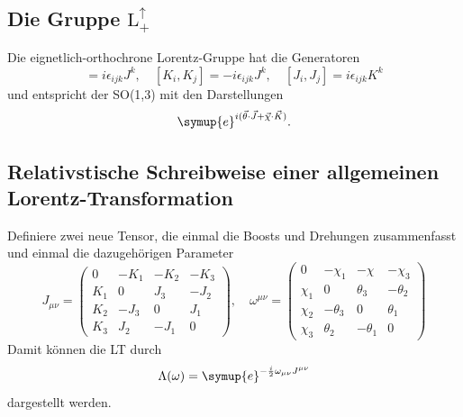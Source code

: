 \documentclass[
  captions=tableheading,  %
  titlepage=firstiscover, %
]{scrartcl}
\begin{document}
\subsection{Die Gruppe \texorpdfstring{$\text{L}_+^{\uparrow}$}{PDFstring} }
Die eignetlich-orthochrone Lorentz-Gruppe hat die Generatoren 
\begin{equation*}
  [J_i,J_j] = i \epsilon_{ijk} J^k,\quad [K_i, K_j] = - i \epsilon_{ijk} J^k, 
  \quad [J_i,J_j] = i \epsilon_{ijk} K^k \label{eqn:genspinor}
\end{equation*}
und entspricht der SO(1,3) mit den Darstellungen
\begin{equation*}
  \symup{e}^{i(\vec{\theta} \cdot \vec{J} + \vec{\chi} \cdot \vec{K})}.
\end{equation*}
\subsection{Relativstische Schreibweise einer allgemeinen Lorentz-Transformation}
Definiere zwei neue Tensor, die einmal die Boosts und Drehungen zusammenfasst und einmal 
die dazugehörigen Parameter
\begin{equation*}
  J_{\mu \nu} = 
  \begin{pmatrix}
    0   & -K_1  & -K_2& -K_3  \\
    K_1 & 0     & J_3 & -J_2  \\
    K_2 & -J_3  & 0   & J_1   \\
    K_3 & J_2   & -J_1 & 0  
  \end{pmatrix}, \quad 
  \omega^{\mu \nu} = 
  \begin{pmatrix}
    0   & -\chi_1       & -  \chi   & -\chi_3  \\
    \chi_1 & 0          & \theta_3  & - \theta_2  \\
    \chi_2 & -\theta_3  & 0         &   \theta_1   \\
    \chi_3 &  \theta_2  & -\theta_1  & 0  
  \end{pmatrix}
\end{equation*}
Damit können die LT durch 
\begin{equation*}
  \Lambda(\omega) = \symup{e}^{-\frac{i}{2} \omega_{\mu \nu} J^{\mu \nu}}
\end{equation*}
dargestellt werden.
\end{document}
